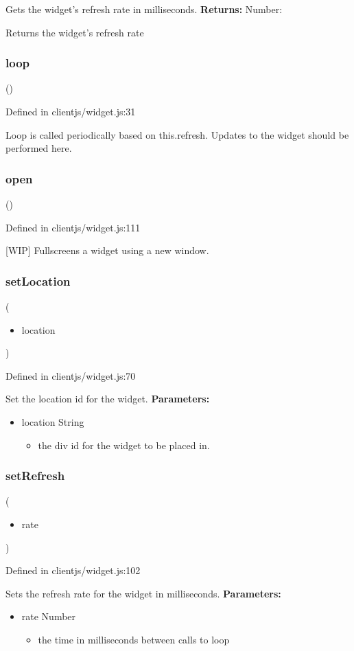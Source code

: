 \documentclass[10pt]{article}
\begin{document}
 Gets the widget's refresh rate in milliseconds.
\textbf{Returns:}
Number: 

 Returns the widget's refresh rate
\subsubsection*{loop}
()

  Defined in clientjs/widget.js:31


 Loop is called periodically based on this.refresh. Updates to the widget should be performed here.
\subsubsection*{open}
()

  Defined in clientjs/widget.js:111


 [WIP] Fullscreens a widget using a new window.
\subsubsection*{setLocation}
(\begin{itemize}
\item location

\end{itemize}
)

  Defined in clientjs/widget.js:70


 Set the location id for the widget.
\textbf{Parameters:}
\begin{itemize}
\item location String\begin{itemize}
\item the div id for the widget to be placed in.

\end{itemize}


\end{itemize}
\subsubsection*{setRefresh}
(\begin{itemize}
\item rate

\end{itemize}
)

  Defined in clientjs/widget.js:102


 Sets the refresh rate for the widget in milliseconds.
\textbf{Parameters:}
\begin{itemize}
\item rate Number\begin{itemize}
\item the time in milliseconds between calls to loop

\end{itemize}


\end{itemize}
\end{document}
